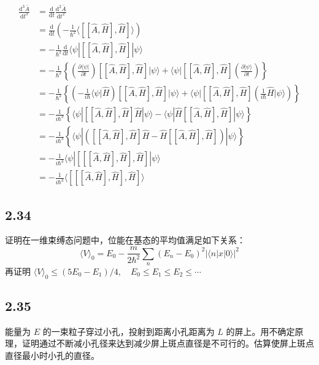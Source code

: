 \begin{equation}
    \begin{aligned}
        \frac{\mathrm{d}^3\bar{A}}{\mathrm{d}t^3}&=\frac{\mathrm{d}}{\mathrm{d}t}\frac{\mathrm{d}^2\bar{A}}{\mathrm{d}t^2}
\\
&=\frac{\mathrm{d}}{\mathrm{d}t}\left( -\frac{1}{\hbar ^2}\langle [[\hat{A},\hat{H}],\hat{H}]\rangle \right) 
\\
&=-\frac{1}{\hbar ^2}\frac{\mathrm{d}}{\mathrm{d}t}\langle \psi |[[\hat{A},\hat{H}],\hat{H}]|\psi \rangle 
\\
&=-\frac{1}{\hbar ^2}\left\{ \left( \frac{\partial \langle \psi |}{\partial t} \right) [[\hat{A},\hat{H}],\hat{H}]|\psi \rangle +\langle \psi |[[\hat{A},\hat{H}],\hat{H}]\left( \frac{\partial |\psi \rangle}{\partial t} \right) \right\} 
\\
&=-\frac{1}{\hbar ^2}\left\{ \left( -\frac{1}{i\hbar}\langle \psi |\hat{H} \right) [[\hat{A},\hat{H}],\hat{H}]|\psi \rangle +\langle \psi |[[\hat{A},\hat{H}],\hat{H}]\left( \frac{1}{i\hbar}\hat{H}|\psi \rangle \right) \right\} 
\\
&=-\frac{1}{i\hbar ^3}\left\{ \langle \psi |[[\hat{A},\hat{H}],\hat{H}]\hat{H}|\psi \rangle -\langle \psi |\hat{H}[[\hat{A},\hat{H}],\hat{H}]|\psi \rangle \right\} 
\\
&=-\frac{1}{i\hbar ^3}\left\{ \langle \psi |\left( [[\hat{A},\hat{H}],\hat{H}]\hat{H}-\hat{H}[[\hat{A},\hat{H}],\hat{H}] \right) |\psi \rangle \right\} 
\\
&=-\frac{1}{i\hbar ^3}\langle \psi |[[[\hat{A},\hat{H}],\hat{H}],\hat{H}]|\psi \rangle 
\\
&=-\frac{1}{i\hbar ^3}\langle [[[\hat{A},\hat{H}],\hat{H}],\hat{H}]\rangle 
    \end{aligned}
\end{equation}


\subsection{2.34}
证明在一维束缚态问题中，位能在基态的平均值满足如下关系：
$$\langle V \rangle_0 = E_0 - \frac{m}{2\hbar^2} \sum_n (E_n - E_0)^2 |\langle n| x | 0 \rangle|^2$$
再证明 $\langle V \rangle_0 \leq (5E_0 - E_1)/4, \quad E_0 \leq E_1 \leq E_2 \leq \cdots$

\subsection{2.35}
能量为 $E$ 的一束粒子穿过小孔，投射到距离小孔距离为 $L$ 的屏上。用不确定原理，证明通过不断减小孔径来达到减少屏上斑点直径是不可行的。估算使屏上斑点直径最小时小孔的直径。

